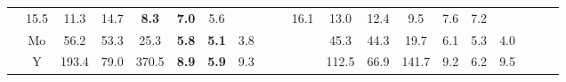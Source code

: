 \documentclass[french,10pt]{article}
\begin{document}
\begin{landscape}
\begin{longtable}{ l  c | c c c | c c c | c c c | c c c | c c c | c c c | }
                    &                     15.5
     & {\footnotesize     11.3
    } & {\footnotesize     14.7
     }
    
    
                    &                     \textbf{ 8.3}
     & {\footnotesize     \textbf{ 7.0}
    } & {\footnotesize     5.6
     }
    
    
                    & & &

                    &                     16.1
     & {\footnotesize     13.0
    } & {\footnotesize     12.4
     }
    
    
                    &                     9.5
     & {\footnotesize     7.6
    } & {\footnotesize     7.2
     }
    
    
                    & & &

                    \\*
                        & {\small Mo  }

                    &                     56.2
     & {\footnotesize     53.3
    } & {\footnotesize     25.3
     }
    
    
                    &                     \textbf{ 5.8}
     & {\footnotesize     \textbf{ 5.1}
    } & {\footnotesize     3.8
     }
    
    
                    & & &

                    &                     45.3
     & {\footnotesize     44.3
    } & {\footnotesize     19.7
     }
    
    
                    &                     6.1
     & {\footnotesize     5.3
    } & {\footnotesize     4.0
     }
    
    
                    & & &

                    \\*
                        & {\small Y  }

                    &                     193.4
     & {\footnotesize     79.0
    } & {\footnotesize     370.5
     }
    
    
                    &                     \textbf{ 8.9}
     & {\footnotesize     \textbf{ 5.9}
    } & {\footnotesize     9.3
     }
    
    
                    & & &

                    &                     112.5
     & {\footnotesize     66.9
    } & {\footnotesize     141.7
     }
    
    
                    &                     9.2
     & {\footnotesize     6.2
    } & {\footnotesize     9.5
     }
    

\end{longtable}
\end{landscape}
\end{document}
